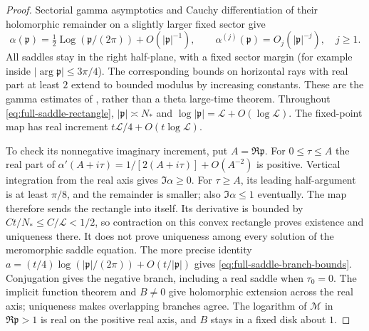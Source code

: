 \begin{proof}
Sectorial gamma asymptotics and Cauchy differentiation of their
holomorphic remainder on a slightly larger fixed sector give
\begin{equation}
 \alpha(\mathfrak p)=\tfrac12\operatorname{Log}(\mathfrak p/(2\pi))
                         +O(|\mathfrak p|^{-1}),\qquad
 \alpha^{(j)}(\mathfrak p)=O_j(|\mathfrak p|^{-j}),\quad j\ge1.
 \label{eq:full-saddle-sector}
\end{equation}
All saddles stay in the right half-plane, with a fixed sector margin
(for example inside $|\arg\mathfrak p|\le3\pi/4$).
The corresponding bounds on horizontal rays with real part at least
$2$ extend to bounded modulus by increasing constants. These are the
gamma estimates of \cite{DLMFGammaOuter2026}, rather than a theta
large-time theorem. Throughout \eqref{eq:full-saddle-rectangle},
$|\mathfrak p|\asymp N_*$ and
$\log|\mathfrak p|=\mathcal L+O(\log\mathcal L)$.
The fixed-point map has real increment
$t\mathcal L/4+O(t\log\mathcal L)$.

To check its nonnegative imaginary increment, put $A=\Re\mathfrak p$.
For $0\le\tau\le A$ the real part of
$\alpha'(A+i\tau)=1/[2(A+i\tau)]+O(A^{-2})$ is positive.
Vertical integration from the real axis gives $\Im\alpha\ge0$.
For $\tau\ge A$, its leading half-argument is at least $\pi/8$,
and the remainder is smaller; also $\Im\alpha\le1$ eventually.
The map therefore sends the rectangle into itself. Its derivative is
bounded by $Ct/N_*\le C/\mathcal L<1/2$, so contraction on this convex
rectangle proves existence and uniqueness there. It does not prove
uniqueness among every solution of the meromorphic saddle equation.
The more precise identity
$a=(t/4)\log(|\mathfrak p|/(2\pi))+O(t/|\mathfrak p|)$
gives \eqref{eq:full-saddle-branch-bounds}.
Conjugation gives the negative branch, including a real saddle when
$\tau_0=0$. The implicit function theorem and $B\ne0$ give holomorphic
extension across the real axis; uniqueness makes overlapping branches
agree. The logarithm of $\mathcal M$ in $\Re\mathfrak p>1$ is real on
the positive real axis, and $B$ stays in a fixed disk about $1$.
\end{proof}

